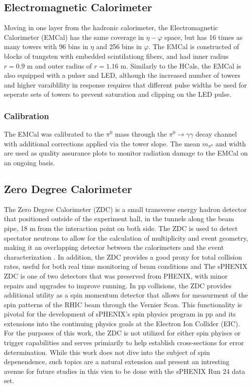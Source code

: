 \documentclass[letterpaper, 12pt, oneside]{book}
\theoremstyle{definition}
\begin{document}
	\subsection{Electromagnetic Calorimeter}
		Moving in one layer from the hadronic calorimeter, the Electromagnetic Calorimeter (EMCal) has the same coverage in $\eta-\varphi$ space,
		but has 16 times as many towers with 96 bins in $\eta$ and 256 bins in $\varphi$. 
		The EMCal is constructed of blocks of tungsten with embedded scintilationg fibers, 
		and had inner radius $r=0.9$ m and outer radius of $r=1.16$ m.
		Similarly to the HCals, the EMCal is also equipped with a pulser and LED, although the increased number of towers and higher varaiblility 
		in response requires that different pulse widths be used for seperate sets of towers to prevent saturation and clipping on the LED pulse.
		\subsubsection{Calibration}
			The EMCal was calibrated to the $\pi^0$ mass through the $\pi^0 \rightarrow \gamma \gamma$ decay channel with additional corrections
			applied via the tower slope. 
			The mean $m_{\pi^0}$ and width are used as quality assurance plots to monitor radiation damage to the EMCal on an ongoing basis.
	\subsection{Zero Degree Calorimeter}
		The Zero Degree Calorimeter (ZDC) is a small transverse energy hadron detector that positioned outside of the experiment hall, in the tunnels along the beam pipe, 18 m from the interaction point on both side.
		The ZDC is used to detect spectator neutrons to allow for the calculation of multiplicity and event geometry, making it an overlapping detector between the calorimeters and the event characterization \cite{sphenix_ZDC}. 
		In addition, the ZDC provides a good proxy for total collision rates, useful for both real time monitoring of beam conditions and 
		The sPHENIX ZDC is one of two detectors that was preserved from PHENIX, with minor repairs and upgrades to improve running.
		In pp collisions, the ZDC provides additional utility as a spin momentum detector that allows for measurment of the spin patterns of the RHIC beam through the Vernier Scan. 
		This functionality is pivotal for the development of sPHENIX's spin physics program in pp and its extensions into the continuing physics goals at the Electron Ion Collider (EIC)\cite{sphenix_ZDC}.
		For the purposes of this work, the ZDC is not utilized for either spin phyiscs or trigger capabilities and serves primiarily to help establish cross-sections for error determination. 
		While this work does not dive into the subject of spin depenendence, such topics are a natural extension and present an intresting avenue for future studies in this vien to be done with the sPHENIX Run 24 data set. 
\end{document}
